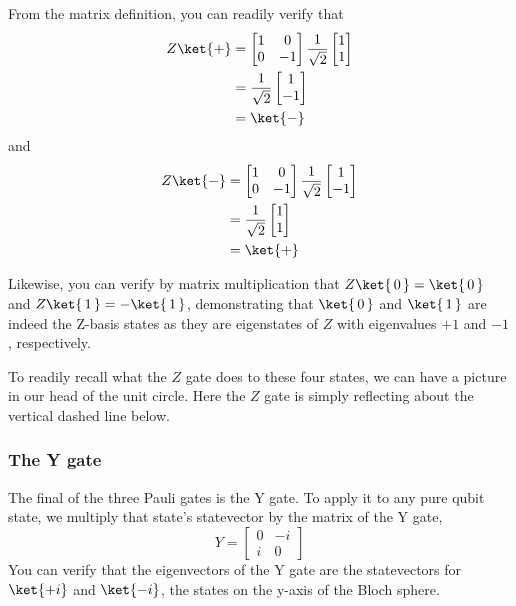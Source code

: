 \documentclass{article}
\theoremstyle{definition}
\newcommand{\kz}[1]{\ket{\,#1\,}}
\newcommand{\kx}[1]{\ket{#1}}
\begin{document}
From the matrix definition, you can readily verify that
\begin{align}
	Z \kx+ &= \begin{bmatrix}
		1 & 0\\
		0 & -1
	\end{bmatrix} \frac{1}{\sqrt{2}}\begin{bmatrix}
		1\\
		1
	\end{bmatrix}\\
	&= \frac{1}{\sqrt{2}}\begin{bmatrix}
		1\\
		-1
	\end{bmatrix}\\
	&= \kx-
\end{align}
and
\begin{align}
	Z \kx- &= \begin{bmatrix}
		1 & 0\\
		0 & -1
	\end{bmatrix} \frac{1}{\sqrt{2}}\begin{bmatrix}
		1\\
		-1
	\end{bmatrix}\\
	&= \frac{1}{\sqrt{2}}\begin{bmatrix}
		1\\
		1
	\end{bmatrix}\\
	&= \kx+
\end{align}

Likewise, you can verify by matrix multiplication that $Z \kz0 = \kz0$ and $Z \kz1 = -\kz1$, demonstrating that $\kz0$ and $\kz1$ are indeed the Z-basis states as they are eigenstates of $Z$ with eigenvalues $+1$ and $-1$, respectively.

To readily recall what the $Z$ gate does to these four states, we can have a picture in our head of the unit circle.
Here the $Z$ gate is simply reflecting about the vertical dashed line below.
\begin{figure}[H]
\end{figure}
\begin{figure}[H]
\end{figure}

\subsubsection{The Y gate}
The final of the three Pauli gates is the Y gate.
To apply it to any pure qubit state, we multiply that state's statevector by the matrix of the Y gate,
\begin{equation}
	Y = \begin{bmatrix}
		0 & -i\\
		i & 0
	\end{bmatrix}
\end{equation}
You can verify that the eigenvectors of the Y gate are the statevectors for $\ket{+i}$ and $\ket{-i}$, the states on the y-axis of the Bloch sphere.
\end{document}
